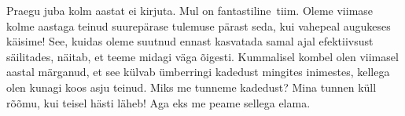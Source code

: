 
Praegu juba kolm aastat ei kirjuta. Mul on fantastiline tiim. Oleme viimase kolme aastaga teinud suurepärase tulemuse pärast seda, kui vahepeal augukeses 
käisime! See, kuidas oleme suutnud ennast kasvatada samal ajal efektiivsust säilitades, näitab, et teeme midagi väga õigesti. Kummalisel kombel olen viimasel aastal märganud, et see külvab 
ümberringi kadedust mingites inimestes, kellega olen kunagi koos 
asju teinud. Miks me tunneme kadedust? Mina tunnen küll 
rõõmu, kui teisel hästi läheb! Aga eks me peame sellega elama. 